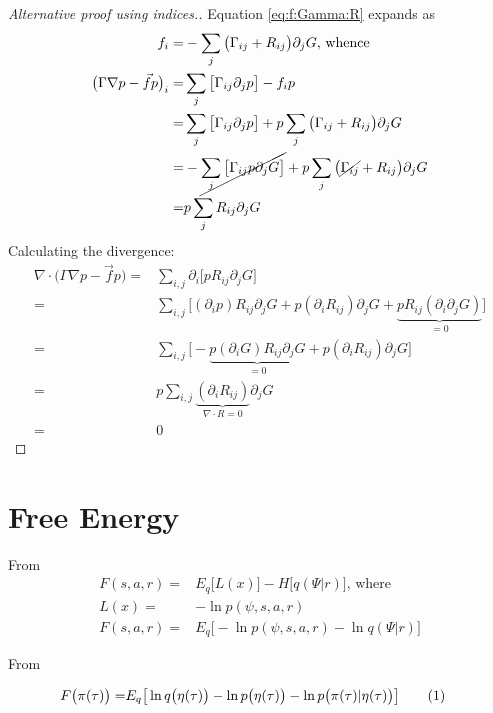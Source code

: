 \documentclass[]{article}
\newcommand\numberthis{\addtocounter{equation}{1}\tag{\theequation}}
\begin{document}
\begin{proof}[Alternative proof using indices.]
	Equation \eqref{eq:f:Gamma:R} expands as 
	\begin{align*}
		f_i =& - \sum_{j}\big(\Gamma_{ij}+R_{ij}\big)\partial_j G \text{, whence}\\
		\big(\Gamma\nabla p - \vec{f} p\big)_i =& \sum_{j}\big[\Gamma_{ij}\partial_j p\big] -  f_i p\\
		=& \sum_{j}\big[\Gamma_{ij}\partial_j p\big] + p\sum_{j}\big(\Gamma_{ij}+R_{ij}\big)\partial_j G  \\
		=& - \cancel{\sum_{j}\big[\Gamma_{ij}p\partial_j G\big]} + p\sum_{j}\big(\cancel{\Gamma_{ij}}+R_{ij}\big)\partial_j G \\
		=& p\sum_{j}R_{ij}\partial_j G
	\end{align*}
	Calculating the divergence:
	\begin{align*}
		\nabla \cdot \big(\Gamma\nabla p - \vec{f} p\big) =& \sum_{i,j} \partial_i \big[p R_{ij}\partial_j G\big]\\
		=& \sum_{i,j} \big[(\partial_i p) R_{ij}\partial_j G + p (\partial_i  R_{ij})\partial_j G +\underbrace{ p R_{ij}(\partial_i \partial_j G)}_{=0}\big]\\
		=& \sum_{i,j} \big[-\underbrace{p (\partial_i G) R_{ij}\partial_j G}_{=0} + p (\partial_i  R_{ij})\partial_j G \big] \\
		=& p \sum_{i,j} \underbrace{(\partial_i  R_{ij})}_{\nabla\cdot R=0}\partial_j G\\
		=& 0
	\end{align*}

\end{proof}

\section{Free Energy}


From \cite{friston2016therefore}
\begin{align*}
	F(s,a,r) =& E_q\big[L(x)\big]-H\big[q(\Psi\vert r)\big] \text{, where}\\
	L(x) =& -\ln{p(\psi,s,a,r)}\\
	F(s,a,r) =&  E_q\big[ -\ln{p(\psi,s,a,r)} - \ln{q(\Psi\vert r)}\big]
\end{align*}

From \cite{friston2022free}

\begin{align*}
	F\big(\pi(\tau)\big) =& E_q\big[\ln q\big(\eta(\tau)\big) - \ln p\big(\eta(\tau)\big) - \ln p\big(\pi(\tau)\vert\eta(\tau)\big)\big] \numberthis \label{eq:free:energy}
\end{align*}
\end{document}
